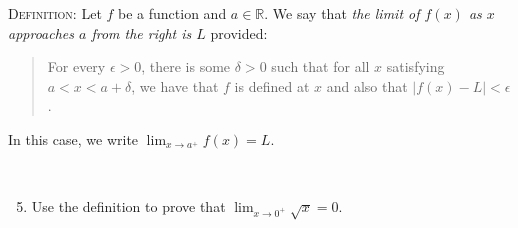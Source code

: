 \documentclass{amsart}
\def\e{\varepsilon}
\def\R{\mathbb R}
\def\e{\epsilon}
\def\d{\delta}
\begin{document}
\noindent \textsc{Definition:} Let $f$ be a function and $a\in \R$. We say that \emph{the limit of $f(x)$ as $x$ approaches $a$ from the right is $L$} provided:
\begin{quote} For every $\e>0$, there is some $\d>0$ such that for all $x$ satisfying $a<x<a+\d$, we have that $f$ is defined at $x$ and also that $|f(x) - L| < \e$.
\end{quote}
In this case, we write $\displaystyle \lim_{x\to a^+} f(x) = L$.

\

\begin{enumerate} \setcounter{enumi}{4}
\item Use the definition to prove that $\lim_{x\to 0^+} \sqrt{x} = 0$.
\end{enumerate}
\end{document}
